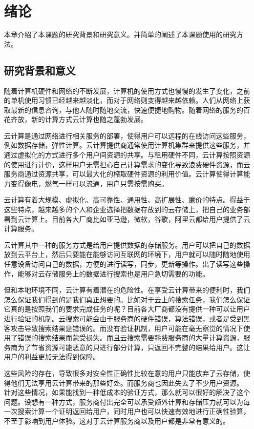 \chapter{绪论}
\label{chap:introduction}

本章介绍了本课题的研究背景和研究意义。并简单的阐述了本课题使用的研究方法。

\section{研究背景和意义}
随着计算机硬件和网络的不断发展，计算机的使用方式也慢慢的发生了变化，之前的单机使用习惯已经越来越淡化，而对于网络则变得越来越依赖。人们从网络上获取最新的信息咨询，与他人随时随地交流，快速便捷地购物。随着网络的服务的百花齐放，新的计算方式云计算也随之蓬勃发展。

云计算\cite{CloudComputing}是通过网络进行相关服务的部署，使得用户可以远程的在线访问这些服务，例如数据存储，弹性计算。云计算提供商通常使用计算机集群来提供这些服务，并通过虚拟化的方式进行多个用户间资源的共享。与租用硬件不同，云计算按照资源的使用进行计价，这样用户无需担心自己计算需求的变化导致浪费硬件资源，而云服务商通过资源共享，可以最大化的榨取硬件资源的利用价值。云计算使得计算能力变得像电，燃气一样可以流通，用户只需按需购买。

云计算有着大规模、虚拟化、高可靠性、通用性、高扩展性、廉价的特点。得益于这些特点，越来越多的个人和企业选择把数据存放到的云存储上，把自己的业务部署到云计算上。目前各大厂商比如亚马逊，微软，谷歌，阿里云都给用户提供了云计算服务。

云计算其中一种的服务方式是给用户提供数据的存储服务。用户可以把自己的数据放到云平台上，然后只要能在能够访问互联网的环境下，用户就可以随时随地使用任意设备访问自己的数据，方便的进行读写，同步，更新等操作。出了读写这些操作，能够对云存储服务上的数据进行搜索也是用户急切需要的功能。

但和本地环境不同，云计算有着潜在的危险性\cite{CloudComputing}。在享受云计算带来的便利时，我们怎么保证我们得到的是我们真正想要的。比如对于云上的搜索任务，我们怎么保证它真的是按照我们的要求完成任务的呢？目前各大厂商都没有提供一种可以让用户进行验证的机制。云搜索可能会由于服务商的硬件错误，算法错误，或者是受到黑客攻击导致搜索结果是错误的。而没有验证机制，用户可能在毫无察觉的情况下使用了错误的搜索结果而蒙受损失。而且云搜索需要耗费服务商的大量计算资源，服务商为了节省资源可能恶意的只进行部分计算，只返回不完整的结果给用户。这让用户的利益更加无法得到保障。

这些风险的存在，导致很多对安全性正确性比较在意的用户只能放弃了云存储，使得他们无法享用云计算带来的那些好处。而服务商也因此失去了不少用户资源。
针对这些情况，如果能找到一种低成本的验证方式，那么就可以很好的解决了这个问题。设想有一种方式，服务商付出完全可以承受额外计算和存储压力就可以为每一次搜索计算一个证明返回给用户，同时用户也可以快速有效地进行正确性验算，不至于影响到用户体验。这对于云计算服务商以及用户都是非常有意义的。

